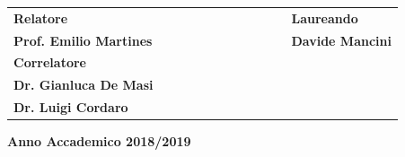 \documentclass[twoside,openright,titlepage,headings,footinclude=true,cleardoublepage=empty,BCOR=5mm,11pt,a4paper,english]{book}
\begin{document}
\begin{titlepage}
\vspace{10mm}
\begin{spacing}{1.5}
\begin{tabular}{ l  c  c c c  cc c c c c  l }
{\Large{\bf Relatore}} &&&&&&&&&&& {\Large{\bf Laureando}}\\
{\Large{\bf Prof. Emilio Martines}} &&&&&&&&&&& {\Large{\bf Davide Mancini}}\\
{\Large{\bf Correlatore}}\\
{\Large{\bf Dr. Gianluca De Masi}}\\
{\Large{\bf Dr. Luigi Cordaro}}\\
\end{tabular}
\end{spacing}
\vspace{30 mm}

\begin{center}
{\Large{\bf Anno Accademico 2018/2019}}
\end{center}
\end{titlepage}
\clearpage{\pagestyle{empty}\cleardoublepage}
\end{document}
